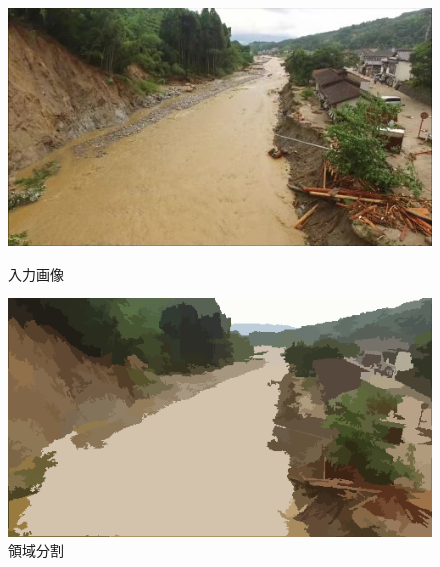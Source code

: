 \documentclass[a4paper, twocolumn, xelatex, 8pt, ja=standard, Ligatures=TeX]{bxjsarticle}
\begin{document}
	\begin{figure}[b]
		\begin{minipage}{0.48\hsize}
			\centering
			\includegraphics[width=\linewidth]{img/original.png}
			\caption{入力画像}
			\label{img02}
		\end{minipage}
		\begin{minipage}{0.48\hsize}
			\centering
			\includegraphics[width=\linewidth]{img/meanshift.png}
			\caption{領域分割}
			\label{img03}
		\end{minipage}
	\end{figure}
\end{document}
